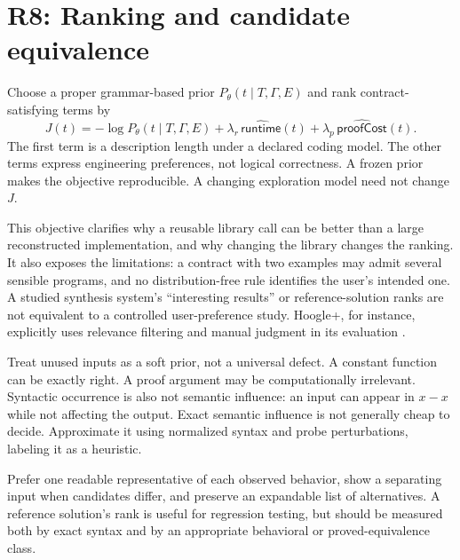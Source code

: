 \section{R8: Ranking and candidate equivalence}\label{sec:r8}


Choose a proper grammar-based prior $P_\theta(t\mid T,\Gamma,E)$ and rank
contract-satisfying terms by
\[
 J(t)=-\log P_\theta(t\mid T,\Gamma,E)
       +\lambda_{r}\,\widehat{\mathsf{runtime}}(t)
       +\lambda_{p}\,\widehat{\mathsf{proofCost}}(t).
 \tag{10}\label{eq:ranking}
\]
The first term is a description length under a declared coding model. The
other terms express engineering preferences, not logical correctness. A
frozen prior makes the objective reproducible. A changing exploration model
need not change $J$.

This objective clarifies why a reusable library call can be better than a
large reconstructed implementation, and why changing the library changes the
ranking. It also exposes the limitations: a contract with two examples may
admit several sensible programs, and no distribution-free rule identifies the
user's intended one. A studied synthesis system's ``interesting results'' or
reference-solution ranks are not equivalent to a controlled user-preference
study. Hoogle+, for instance, explicitly uses relevance filtering and manual
judgment in its evaluation \cite{hoogleplus}.

Treat unused inputs as a soft prior, not a universal defect. A constant
function can be exactly right. A proof argument may be computationally
irrelevant. Syntactic occurrence is also not semantic influence: an input can
appear in $x-x$ while not affecting the output. Exact semantic influence is
not generally cheap to decide. Approximate it using normalized syntax and
probe perturbations, labeling it as a heuristic.

Prefer one readable representative of each observed behavior, show a
separating input when candidates differ, and preserve an expandable list of
alternatives. A reference solution's rank is useful for regression testing,
but should be measured both by exact syntax and by an appropriate behavioral
or proved-equivalence class.

